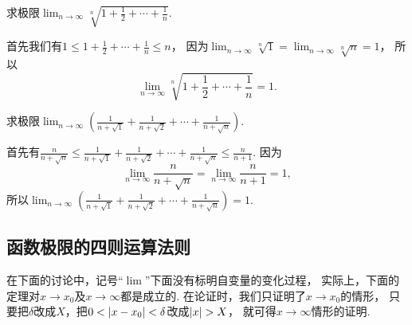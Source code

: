 \begin{example}
求极限\(\lim_{n\to\infty} \sqrt[n]{1+\frac12+\dotsb+\frac1n}\).
\begin{solution}
首先我们有\(1 \leq 1+\frac12+\dotsb+\frac1n \leq n\)，
因为\(\lim_{n\to\infty} \sqrt[n]{1} = \lim_{n\to\infty} \sqrt[n]{n} = 1\)，
所以\[
	\lim_{n\to\infty} \sqrt[n]{1+\frac12+\dotsb+\frac1n} = 1.
\]
\end{solution}
\end{example}

\begin{example}
求极限\(\lim_{n\to\infty} \left(\frac1{n+\sqrt1}+\frac1{n+\sqrt2}+\dotsb+\frac1{n+\sqrt{n}}\right)\).
\begin{solution}
首先有\(\frac{n}{n+\sqrt{n}}
\leq \frac1{n+\sqrt1}+\frac1{n+\sqrt2}+\dotsb+\frac1{n+\sqrt{n}}
\leq \frac{n}{n+1}\).
因为\[
	\lim_{n\to\infty} \frac{n}{n+\sqrt{n}}
	= \lim_{n\to\infty} \frac{n}{n+1} = 1,
\]
所以\(\lim_{n\to\infty} \left(\frac1{n+\sqrt1}+\frac1{n+\sqrt2}+\dotsb+\frac1{n+\sqrt{n}}\right) = 1\).
\end{solution}
\end{example}

\subsection{函数极限的四则运算法则}
在下面的讨论中，记号“\(\lim\)”下面没有标明自变量的变化过程，
实际上，下面的定理对\(x \to x_0\)及\(x \to \infty\)都是成立的.
在论证时，我们只证明了\(x \to x_0\)的情形，
只要把\(\delta\)改成\(X\)，把\(0<\abs{x-x_0}<\delta\)改成\(\abs{x}>X\)，
就可得\(x\to\infty\)情形的证明.

